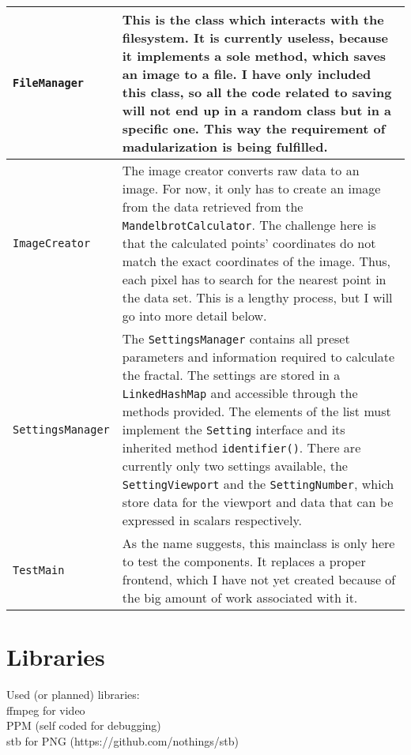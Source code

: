 \documentclass[10pt,a4paper,titlepage]{article}
\begin{document}
\begin{table}[h!]
\begin{tabular}{p{}|p{}}
			\hline
			\verb|FileManager|& This is the class which interacts with the filesystem. It is currently useless, because it implements a sole method, which saves an image to a file. I have only included this class, so all the code related to saving will not end up in a random class but in a specific one. This way the requirement of madularization is being fulfilled. \\ 
			\hline
			\verb|ImageCreator|& The image creator converts raw data to an image. For now, it only has to create an image from the data retrieved from the \verb|MandelbrotCalculator|. The challenge here is that the calculated points' coordinates do not match the exact coordinates of the image. Thus, each pixel has to search for the nearest point in the data set. This is a lengthy process, but I will go into more detail below. \\ 
			\hline 
			\verb|SettingsManager|& The \verb|SettingsManager| contains all preset parameters and information required to calculate the fractal. The settings are stored in a \verb|LinkedHashMap| and accessible through the methods provided. The elements of the list must implement the \verb|Setting| interface and its inherited method \verb|identifier()|. There are currently only two settings available, the \verb|SettingViewport| and the \verb|SettingNumber|, which store data for the viewport and data that can be expressed in scalars respectively. \\ 
			\hline 
			\verb|TestMain|& As the name suggests, this mainclass is only here to test the components. It replaces a proper frontend, which I have not yet created because of the big amount of work associated with it. \\ 
		\end{tabular} 
	\end{table}
	
	
	\section{Libraries}
	Used (or planned) libraries:\\
	ffmpeg for video\\
	PPM (self coded for debugging)\\
	stb for PNG (https://github.com/nothings/stb)\\
\end{document}
